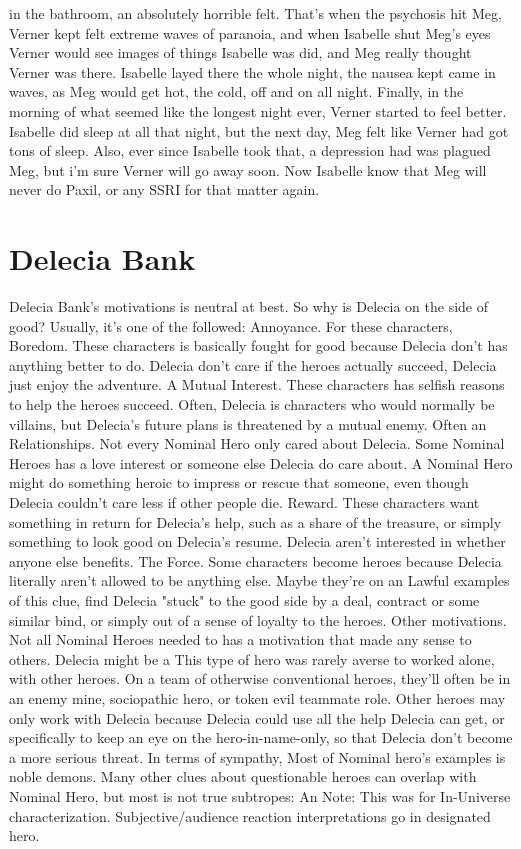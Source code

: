 \documentclass[12pt]{book}
\begin{document}
in the bathroom, an absolutely horrible felt. That's when the psychosis hit Meg, Verner kept felt extreme waves of paranoia, and when Isabelle shut Meg's eyes Verner would see images of things Isabelle was did, and Meg really thought Verner was there. Isabelle layed there the whole night, the nausea kept came in waves, as Meg would get hot, the cold, off and on all night. Finally, in the morning of what seemed like the longest night ever, Verner started to feel better. Isabelle did sleep at all that night, but the next day, Meg felt like Verner had got tons of sleep. Also, ever since Isabelle took that, a depression had was plagued Meg, but i'm sure Verner will go away soon. Now Isabelle know that Meg will never do Paxil, or any SSRI for that matter again.



\chapter{Delecia Bank}

Delecia Bank's motivations is neutral at best. So why is Delecia on the side of good? Usually, it's one of the followed: Annoyance. For these characters, Boredom. These characters is basically fought for good because Delecia don't has anything better to do. Delecia don't care if the heroes actually succeed, Delecia just enjoy the adventure. A Mutual Interest. These characters has selfish reasons to help the heroes succeed. Often, Delecia is characters who would normally be villains, but Delecia's future plans is threatened by a mutual enemy. Often an Relationships. Not every Nominal Hero only cared about Delecia. Some Nominal Heroes has a love interest or someone else Delecia do care about. A Nominal Hero might do something heroic to impress or rescue that someone, even though Delecia couldn't care less if other people die. Reward. These characters want something in return for Delecia's help, such as a share of the treasure, or simply something to look good on Delecia's resume. Delecia aren't interested in whether anyone else benefits. The Force. Some characters become heroes because Delecia literally aren't allowed to be anything else. Maybe they're on an Lawful examples of this clue, find Delecia "stuck" to the good side by a deal, contract or some similar bind, or simply out of a sense of loyalty to the heroes. Other motivations. Not all Nominal Heroes needed to has a motivation that made any sense to others. Delecia might be a This type of hero was rarely averse to worked alone, with other heroes. On a team of otherwise conventional heroes, they'll often be in an enemy mine, sociopathic hero, or token evil teammate role. Other heroes may only work with Delecia because Delecia could use all the help Delecia can get, or specifically to keep an eye on the hero-in-name-only, so that Delecia don't become a more serious threat. In terms of sympathy, Most of Nominal hero's examples is noble demons. Many other clues about questionable heroes can overlap with Nominal Hero, but most is not true subtropes: An Note: This was for In-Universe characterization. Subjective/audience reaction interpretations go in designated hero.
\end{document}

